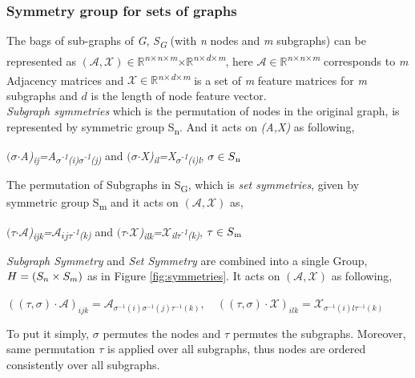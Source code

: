 \documentclass[11pt, dvipsnames, DIV=12]{scrreprt}
\let\originalleft\left
\let\originalright\right
\renewcommand{\left}{\mathopen{}\mathclose\bgroup\originalleft}
\renewcommand{\right}{\aftergroup\egroup\originalright}
\theoremstyle{definition}
\begin{document}
\subsubsection{Symmetry group for sets of graphs}
The bags of sub-graphs of \emph{G}, \emph{S\textsubscript{G}} (with \emph{n} nodes and \emph{m} subgraphs) can be represented as \emph{$(\mathcal{A,X})\in\mathbb{R}$\textsuperscript{n$\times$n$\times$m}$\times\mathbb{R}$\textsuperscript{n$\times$d$\times$m}}, here \emph{$\mathcal{A}\in\mathbb{R}$\textsuperscript{n$\times$n$\times$m}} corresponds to \emph{m} Adjacency matrices and \emph{$\mathcal{X}\in\mathbb{R}$\textsuperscript{n$\times$d$\times$m}} is a set of \emph{m} feature matrices for \emph{m} subgraphs and $d$ is the length of node feature vector.\\
\emph{Subgraph symmetries} which is the permutation of nodes in the original graph, is represented by symmetric group S\textsubscript{n}. And it acts on \textit{(A,X)} as following,
\begin{center}
    \emph{$(\sigma$$\cdot$A)\textsubscript{ij}=A\textsubscript{$\sigma$\textsuperscript{-1}(i)$\sigma$\textsuperscript{-1}(j)}} and \emph{$(\sigma$$\cdot$X)\textsubscript{il}=X\textsubscript{$\sigma$\textsuperscript{-1}(i)l}}, \textit{$ \sigma \in S\textsubscript{n}$}
\end{center}
The permutation of Subgraphs in S\textsubscript{G}, which is \textit{set symmetries}, given by symmetric group  S\textsubscript{m} and it acts on \textit{$\mathcal{(A,X)}$} as,
\begin{center}
    \emph{$(\tau$$\cdot\mathcal{A}$)\textsubscript{ijk}=$\mathcal{A}$\textsubscript{$ij\tau$\textsuperscript{-1}(k)}} and \emph{$(\tau$$\cdot\mathcal{X}$)\textsubscript{ilk}=$\mathcal{X}$\textsubscript{il$\tau$\textsuperscript{-1}(k)}}, \textit{$ \tau \in S\textsubscript{m}$}
\end{center}
\textit{Subgraph Symmetry} and \textit{Set Symmetry} are combined into a single Group, $H=\left(S_n\times S_m\right)$ as in Figure \ref{fig:symmetries}. It acts on $\mathcal{(A,X)}$ as following, \begin{center}
    $
((\tau, \sigma) \cdot \mathcal{A})_{i j k}=\mathcal{A}_{\sigma^{-1}(i) \sigma^{-1}(j) \tau^{-1}(k)}, \quad((\tau, \sigma) \cdot \mathcal{X})_{i l k}=\mathcal{X}_{\sigma^{-1}(i) l \tau^{-1}(k)}
$
\end{center}
To put it simply, $\sigma$ permutes the nodes and $\tau$ permutes the subgraphs. Moreover, same permutation $\tau$ is applied over all subgraphs, thus nodes are ordered consistently over all subgraphs.
\end{document}
